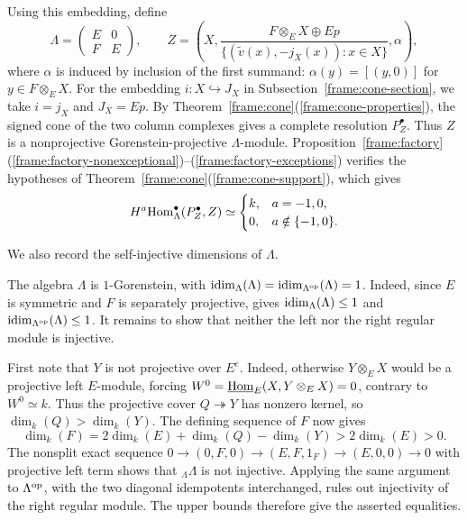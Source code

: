 \documentclass[11pt]{article}
\begin{document}
Using this embedding, define
\begin{equation}\label{app:Z}
 \Lambda=\begin{pmatrix}E&0\\F&E\end{pmatrix},\qquad
 Z=\left(X,
 \frac{F\otimes_EX\oplus Ep}
 {\{(\widetilde v(x),-j_X(x)):x\in X\}},\alpha\right),
\end{equation}
where $\alpha$ is induced by inclusion of the first summand:
$\alpha(y)=[(y,0)]$ for $y\in F\otimes_E X$.
For the embedding $i:X\hookrightarrow J_X$ in
Subsection~\ref{frame:cone-section}, we take $i=j_X$ and $J_X=Ep$.
By Theorem~\ref{frame:cone}\textup{(\ref{frame:cone-properties})},
the signed cone of the two column complexes gives a complete
resolution $P_Z^\bullet$. Thus $Z$ is a nonprojective
Gorenstein-projective $\Lambda$-module. Proposition~\ref{frame:factory}\textup{(\ref{frame:factory-nonexceptional})--(\ref{frame:factory-exceptions})}
verifies the hypotheses of
Theorem~\ref{frame:cone}\textup{(\ref{frame:cone-support})}, which gives
\[
 H^a{\rm Hom}_\Lambda^\bullet(P_Z^\bullet,Z)\simeq
 \begin{cases}k,&a=-1,0,\\0,&a\notin\{-1,0\}.
 \end{cases}
\]

We also record the self-injective dimensions of $\Lambda$.

\begin{Rem}\label{app:gorenstein}
The algebra $\Lambda$ is $1$-Gorenstein, with
${\rm idim}_\Lambda(\Lambda)={\rm idim}_{\Lambda^{\mathrm{op}}}(\Lambda)=1$.
Indeed, since $E$ is symmetric and $F$ is separately projective,
\cite[Proposition~3.7(2)]{Wang} gives
${\rm idim}_\Lambda(\Lambda)\le1$ and
${\rm idim}_{\Lambda^{\mathrm{op}}}(\Lambda)\le1$.
It remains to show that neither the left nor the right regular module is injective.

First note that $Y$ is not projective over $E^e$.
Indeed, otherwise $Y\otimes_E X$ would be a projective left $E$-module,
forcing $W^0=\underline{{\rm Hom}}_E(X,Y\otimes_E X)=0$,
contrary to $W^0\simeq k$.
Thus the projective cover $Q\twoheadrightarrow Y$ has nonzero kernel,
so $\dim_k(Q)>\dim_k(Y)$. The defining sequence of $F$ now gives
\[
 \dim_k(F)=2\dim_k(E)+\dim_k(Q)-\dim_k(Y)>2\dim_k(E)>0.
\]
The nonsplit exact sequence
$0\to(0,F,0)\to(E,F,1_F)\to(E,0,0)\to0$
with projective left term shows that ${}_\Lambda\Lambda$ is not injective.
Applying the same argument to
$\Lambda^{\rm op}$, with the two diagonal idempotents interchanged,
rules out injectivity of the right regular module.
The upper bounds therefore give the asserted equalities.
\end{Rem}
\end{document}
